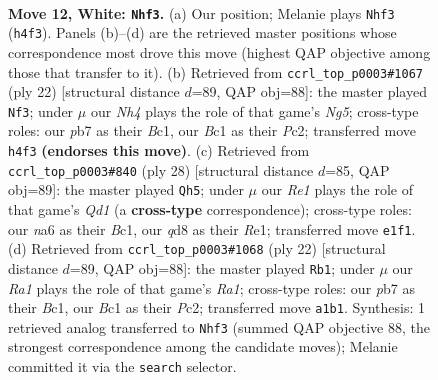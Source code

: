 \documentclass[11pt]{article}
\begin{document}
\clearpage

\begin{figure}[p]\centering
\begin{subfigure}{0.46\textwidth}\centering
\resizebox{\linewidth}{!}{%
\newchessgame
\chessboard[
  setfen={r1bq1rk1/pp5p/n1pb2p1/3p1p1n/3P1P1N/6P1/PP1NP1BP/R1BQR1K1 w - - 1 12},
  showmover=false,
  pgfstyle=straightmove, color=movearrow, markmove={h4-f3}
]}
\caption{}
\end{subfigure}\hfill
\begin{subfigure}{0.46\textwidth}\centering
\resizebox{\linewidth}{!}{%
\newchessgame
\chessboard[
  setfen={r1bq1rk1/p1p2p1p/1pnb2p1/3p2N1/3P4/2PB3P/P1P2PP1/R1BQ1RK1 w - - 0 12},
  showmover=false,
  pgfstyle=straightmove, color=movearrow, markmove={g5-f3}
]}
\caption{}
\end{subfigure}
\\[4pt]
\begin{subfigure}{0.46\textwidth}\centering
\resizebox{\linewidth}{!}{%
\newchessgame
\chessboard[
  setfen={r1bqrnk1/ppb2pp1/2p4p/3pN3/3Pn3/2P4P/PPB2PP1/R1BQRNK1 w - - 0 15},
  showmover=false,
  pgfstyle=straightmove, color=movearrow, markmove={d1-h5}
]}
\caption{}
\end{subfigure}\hfill
\begin{subfigure}{0.46\textwidth}\centering
\resizebox{\linewidth}{!}{%
\newchessgame
\chessboard[
  setfen={r1bq1rk1/p1p2p1p/1pnb2p1/3p2N1/3P4/2PB3P/P1P2PP1/R1BQ1RK1 w - - 0 12},
  showmover=false,
  pgfstyle=straightmove, color=movearrow, markmove={a1-b1}
]}
\caption{}
\end{subfigure}
\caption{\textbf{Move 12, White: \texttt{Nhf3}.} (a) Our position; Melanie plays \texttt{Nhf3} (\texttt{h4f3}). Panels (b)--(d) are the retrieved master positions whose correspondence most drove this move (highest QAP objective among those that transfer to it). (b) Retrieved from \texttt{ccrl\_top\_p0003\#1067} (ply 22) [structural distance $d$=89, QAP obj=88]: the master played \texttt{Nf3}; under $\mu$ our \emph{Nh4} plays the role of that game's \emph{Ng5}; cross-type roles: our \emph{p}b7 as their \emph{B}c1, our \emph{B}c1 as their \emph{P}c2; transferred move \texttt{h4f3} \textbf{(endorses this move)}. (c) Retrieved from \texttt{ccrl\_top\_p0003\#840} (ply 28) [structural distance $d$=85, QAP obj=89]: the master played \texttt{Qh5}; under $\mu$ our \emph{Re1} plays the role of that game's \emph{Qd1} (a \textbf{cross-type} correspondence); cross-type roles: our \emph{n}a6 as their \emph{B}c1, our \emph{q}d8 as their \emph{R}e1; transferred move \texttt{e1f1}. (d) Retrieved from \texttt{ccrl\_top\_p0003\#1068} (ply 22) [structural distance $d$=89, QAP obj=88]: the master played \texttt{Rb1}; under $\mu$ our \emph{Ra1} plays the role of that game's \emph{Ra1}; cross-type roles: our \emph{p}b7 as their \emph{B}c1, our \emph{B}c1 as their \emph{P}c2; transferred move \texttt{a1b1}. Synthesis: 1 retrieved analog transferred to \texttt{Nhf3} (summed QAP objective 88, the strongest correspondence among the candidate moves); Melanie committed it via the \texttt{search} selector.}
\label{fig:thought-m22}
\end{figure}
\end{document}
